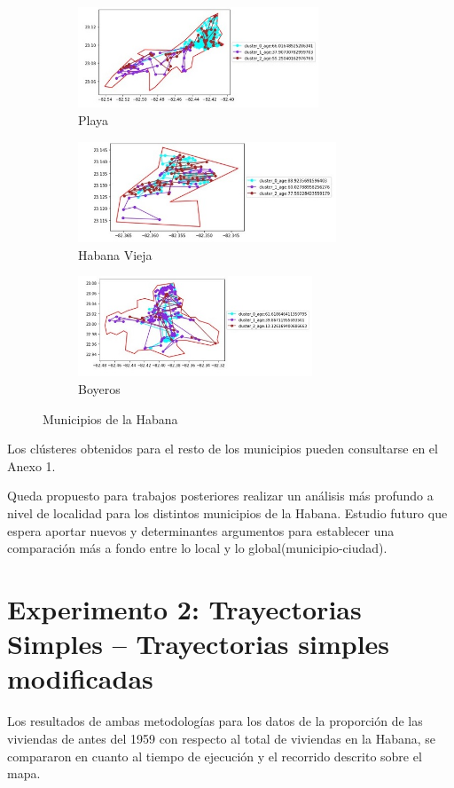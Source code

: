 \begin{figure}[h!]
	\centering
	\begin{subfigure}[b]{0.49\linewidth}
		\includegraphics[width=\linewidth, height=3cm]{Images/Playa.jpg}
		\caption{Playa}
	\end{subfigure}
	\begin{subfigure}[b]{0.49\linewidth}
		\includegraphics[width=\linewidth, height=3cm]{Images/HabV.jpg}
		\caption{Habana Vieja}
	\end{subfigure}
	\begin{subfigure}[b]{0.49\linewidth}
		\includegraphics[width=\linewidth, height=3cm]{Images/Boyeros.jpg}
		\caption{Boyeros}
	\end{subfigure}
	\caption{Municipios de la Habana}
	\label{fig:muns}
	
\end{figure}

Los clústeres obtenidos para el resto de los municipios pueden consultarse en el Anexo 1.

\newpage
Queda propuesto para trabajos posteriores realizar un análisis más profundo a nivel de localidad para los distintos municipios de la Habana. Estudio futuro que espera aportar nuevos y determinantes argumentos para establecer una comparación más a fondo entre lo local y lo global(municipio-ciudad).
\newpage
\section{Experimento 2: Trayectorias Simples – Trayectorias simples modificadas}
Los resultados de ambas metodologías para los datos de la proporción de las viviendas de antes del 1959 con respecto al total de viviendas en la Habana, se compararon en cuanto al tiempo de ejecución y el recorrido descrito sobre el mapa.

